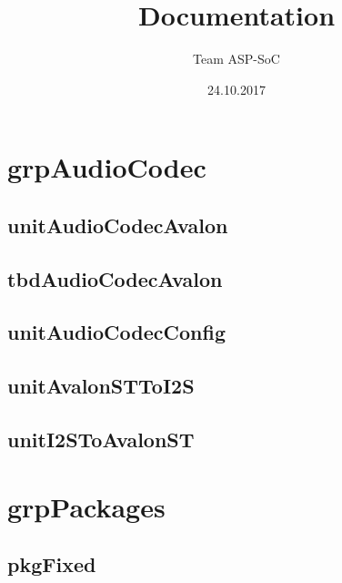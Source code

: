 \documentclass{article}
\title{Documentation}
\author{Team ASP-SoC}
\date{ 24.10.2017 }
\begin{document}
\maketitle
\tableofcontents
\newpage
\section{grpAudioCodec}

\subsection{unitAudioCodecAvalon}



\subsection{tbdAudioCodecAvalon}



\subsection{unitAudioCodecConfig}



\subsection{unitAvalonSTToI2S}



\subsection{unitI2SToAvalonST}



\section{grpPackages}

\subsection{pkgFixed}
\end{document}
